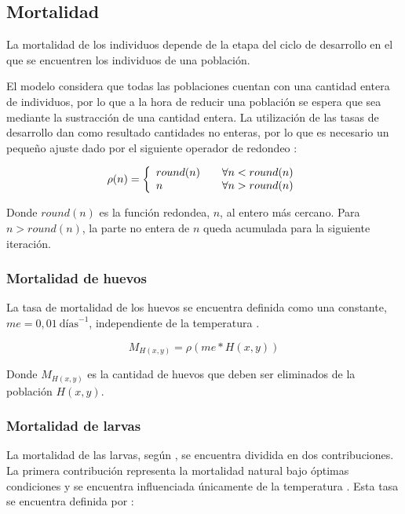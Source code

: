 \subsection{Mortalidad}
\label{subsec:cap4-mortalidad}
La mortalidad de los individuos depende de la etapa del ciclo de desarrollo en el que se encuentren
los individuos de una población.

El modelo considera que todas las poblaciones cuentan con una cantidad entera de individuos, por
lo que a la hora de reducir una población se espera que sea mediante la sustracción de una
cantidad entera. La utilización de las tasas de desarrollo dan como resultado cantidades no enteras, por lo que es necesario un pequeño ajuste dado por el siguiente operador de redondeo :

\begin{equation}
\label{eq:operador-redondeo}
\rho(n) = \left\{
\begin{array}{l l}
   round(n) & \quad  \forall n < round(n)\\
   n & \quad  \forall n > round(n)\\
\end{array} \right.
\end{equation}

Donde $round(n)$ es la función redondea, $n$, al entero más cercano. Para $n > round(n)$, la parte
no entera de $n$ queda acumulada para la siguiente iteración.

\subsubsection{Mortalidad de huevos}
La tasa de mortalidad de los huevos se encuentra definida como una constante,
$me = 0,01\ \text{días}^{-1}$, independiente de la temperatura \cite{otero2006stochastic}.

\begin{equation}
    M_{H(x,y)} = \rho(me * H(x,y))
\end{equation}

Donde $M_{H(x,y)}$ es la cantidad de huevos que deben ser eliminados de la población $H(x,y)$.

\subsubsection{Mortalidad de larvas}
La mortalidad de las larvas, según \cite{otero2006stochastic}, se encuentra dividida en dos
contribuciones. La primera contribución representa la mortalidad natural bajo óptimas condiciones
y se encuentra influenciada únicamente de la temperatura \cite{otero2006stochastic}. Esta tasa se
encuentra definida por :

